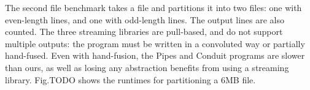 
The second file benchmark takes a file and partitions it into two files: one with even-length lines, and one with odd-length lines.
The output lines are also counted.
The three streaming libraries are pull-based, and do not support multiple outputs: the program must be written in a convoluted way or partially hand-fused.
Even with hand-fusion, the Pipes and Conduit programs are slower than ours, as well as losing any abstraction benefits from using a streaming library.
Fig.TODO 
shows the runtimes for partitioning a 6MB file.








